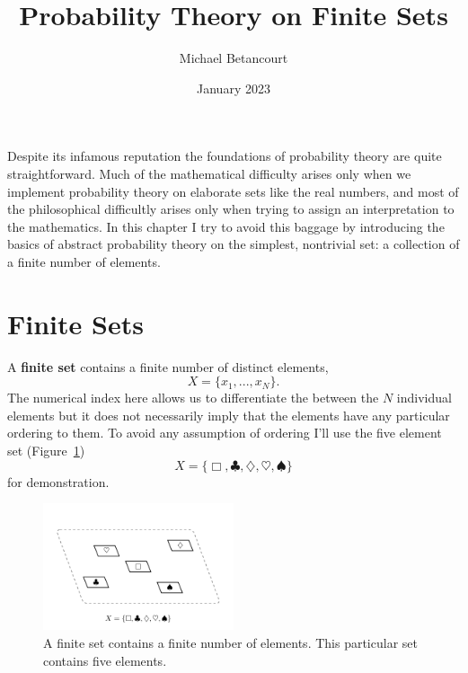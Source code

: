 \documentclass[
  letterpaper,
  DIV=11,
  numbers=noendperiod]{scrartcl}
\title{Probability Theory on Finite Sets}
\author{Michael Betancourt}
\date{January 2023}
\renewcommand*\contentsname{Table of contents}
\newcommand\contentsname{Table of contents}
\begin{document}
\maketitle
\ifdefined\Shaded\renewenvironment{Shaded}{\begin{tcolorbox}[frame hidden, enhanced, boxrule=0pt, interior hidden, borderline west={3pt}{0pt}{shadecolor}, breakable, sharp corners]}{\end{tcolorbox}}\fi

\renewcommand*\contentsname{Table of contents}
{
\hypersetup{linkcolor=}
\setcounter{tocdepth}{3}
\tableofcontents
}
Despite its infamous reputation the foundations of probability theory
are quite straightforward. Much of the mathematical difficulty arises
only when we implement probability theory on elaborate sets like the
real numbers, and most of the philosophical difficultly arises only when
trying to assign an interpretation to the mathematics. In this chapter I
try to avoid this baggage by introducing the basics of abstract
probability theory on the simplest, nontrivial set: a collection of a
finite number of elements.

\hypertarget{finite-sets}{%
\section{Finite Sets}\label{finite-sets}}

A \textbf{finite set} contains a finite number of distinct elements, \[
X = \{x_1, ..., x_N\}.
\] The numerical index here allows us to differentiate the between the
\(N\) individual elements but it does not necessarily imply that the
elements have any particular ordering to them. To avoid any assumption
of ordering I'll use the five element set (Figure~\ref{fig-ambient_set})
\[
X = \{\Box, \clubsuit, \diamondsuit, \heartsuit, \spadesuit\}
\] for demonstration.

\begin{figure}

{\centering \includegraphics[width=0.5\textwidth,height=\textheight]{figures/ambient_set/ambient_set.pdf}

}

\caption{\label{fig-ambient_set}A finite set contains a finite number of
elements. This particular set contains five elements.}

\end{figure}
\end{document}
